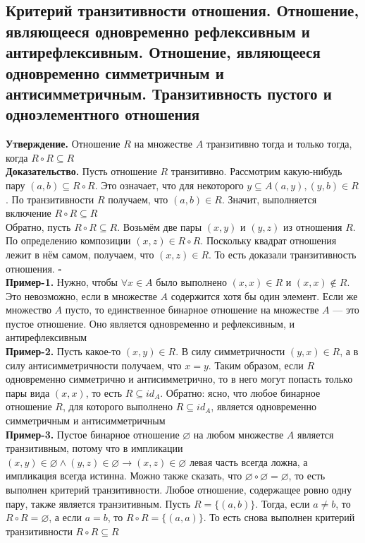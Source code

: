 \documentclass[a4paper]{article}
\newcommand{\qed}{\hfill$\square$}
\begin{document}
\subsection{Критерий транзитивности отношения. Отношение, являющееся одновременно рефлексивным и антирефлексивным. Отношение, являющееся одновременно симметричным и антисимметричным. Транзитивность пустого и одноэлементного отношения}
\label{sec:2.41}\textbf{Утверждение.} Отношение $R$ на множестве $A$ транзитивно тогда и только тогда, когда $R\circ R\subseteq R$\\[2mm]
\textbf{Доказательство.} Пусть отношение $R$ транзитивно. Рассмотрим какую-нибудь пару $(a, b)\subseteq R\circ R$. Это означает, что для некоторого $y\subseteq A (a, y), (y, b) \in R$. По транзитивности $R$ получаем, что $(a, b)\in R$. Значит, выполняется включение $R\circ R\subseteq R$\\[2mm] 
\indent Обратно, пусть $R\circ R\subseteq R$. Возьмём две пары $(x, y)$ и $(y, z)$ из отношения $R$. По определению композиции $(x, z)\in R\circ R$. Поскольку квадрат отношения лежит в нём самом, получаем, что $(x, z)\in R$. То есть доказали транзитивность отношения. \qed\\[2mm]
\indent\textbf{Пример-1.} Нужно, чтобы $\forall x\in A$ было выполнено $(x, x)\in R$ и $(x, x)\notin R$. Это невозможно, если в множестве $A$ содержится хотя бы один элемент. Если же множество $A$ пусто, то единственное бинарное отношение на множестве $A$ — это пустое отношение. Оно является одновременно и рефлексивным, и антирефлексивным\\[2mm]
\indent\textbf{Пример-2.} Пусть какое-то $(x, y)\in R$. В силу симметричности $(y, x)\in R$, а в силу антисимметричности получаем, что $x=y$. Таким образом, если $R$ одновременно симметрично и антисимметрично, то в него могут попасть только пары вида $(x, x)$, то есть $R\subseteq id_A$. Обратно: ясно, что любое бинарное отношение $R$, для которого выполнено $R\subseteq id_A$, является одновременно симметричным и антисимметричным\\[2mm]
\indent\textbf{Пример-3.} Пустое бинарное отношение $\varnothing$ на любом множестве $A$ является транзитивным, потому что в импликации $(x,y)\in\varnothing\wedge(y,z)\in\varnothing\rightarrow(x,z)\in\varnothing$ левая часть всегда ложна, а импликация всегда истинна. Можно также сказать, что $\varnothing\circ\varnothing = \varnothing$, то есть выполнен критерий транзитивности. Любое отношение, содержащее ровно одну пару, также является транзитивным. Пусть $R = \{(a, b)\}$. Тогда, если $a\ne b$, то $R\circ R = \varnothing$, а если $a = b$, то $R\circ R = \{(a, a)\}$. То есть снова выполнен критерий транзитивности $R\circ R\subseteq R$
\end{document}
